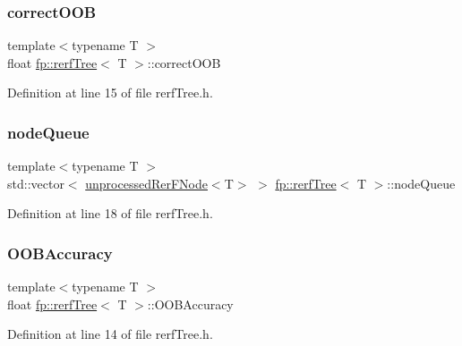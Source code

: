\subsubsection{\texorpdfstring{correct\+O\+OB}{correctOOB}}
{\footnotesize\ttfamily template$<$typename T $>$ \\
float \hyperlink{classfp_1_1rerfTree}{fp\+::rerf\+Tree}$<$ T $>$\+::correct\+O\+OB\hspace{0.3cm}{\ttfamily [protected]}}



Definition at line 15 of file rerf\+Tree.\+h.

\mbox{\label{classfp_1_1rerfTree_a59b3bdcba86acbe93fd46658132218a8}} 
\subsubsection{\texorpdfstring{node\+Queue}{nodeQueue}}
{\footnotesize\ttfamily template$<$typename T $>$ \\
std\+::vector$<$ \hyperlink{classfp_1_1unprocessedRerFNode}{unprocessed\+Rer\+F\+Node}$<$T$>$ $>$ \hyperlink{classfp_1_1rerfTree}{fp\+::rerf\+Tree}$<$ T $>$\+::node\+Queue\hspace{0.3cm}{\ttfamily [protected]}}



Definition at line 18 of file rerf\+Tree.\+h.

\mbox{\label{classfp_1_1rerfTree_a95ef33dc19b2956bb2320e3f89e966b0}} 
\subsubsection{\texorpdfstring{O\+O\+B\+Accuracy}{OOBAccuracy}}
{\footnotesize\ttfamily template$<$typename T $>$ \\
float \hyperlink{classfp_1_1rerfTree}{fp\+::rerf\+Tree}$<$ T $>$\+::O\+O\+B\+Accuracy\hspace{0.3cm}{\ttfamily [protected]}}



Definition at line 14 of file rerf\+Tree.\+h.


